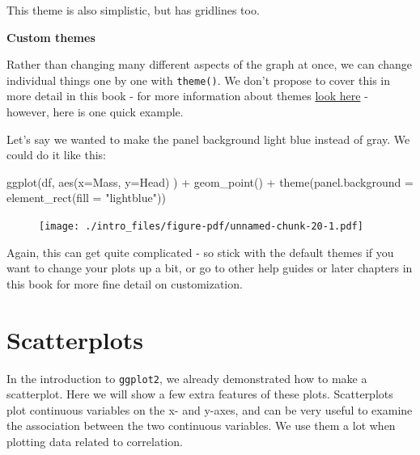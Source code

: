\documentclass[
  letterpaper,
  DIV=11,
  numbers=noendperiod]{scrreprt}
\newenvironment{Shaded}{\begin{snugshade}}{\end{snugshade}}
\newcommand{\AttributeTok}[1]{\textcolor[rgb]{0.40,0.45,0.13}{#1}}
\newcommand{\FunctionTok}[1]{\textcolor[rgb]{0.28,0.35,0.67}{#1}}
\newcommand{\NormalTok}[1]{\textcolor[rgb]{0.00,0.23,0.31}{#1}}
\newcommand{\SpecialCharTok}[1]{\textcolor[rgb]{0.37,0.37,0.37}{#1}}
\newcommand{\StringTok}[1]{\textcolor[rgb]{0.13,0.47,0.30}{#1}}
\begin{document}
This theme is also simplistic, but has gridlines too.

\textbf{Custom themes}

Rather than changing many different aspects of the graph at once, we can
change individual things one by one with \texttt{theme()}. We don't
propose to cover this in more detail in this book - for more information
about themes \href{https://ggplot2-book.org/}{look here} - however, here
is one quick example.

Let's say we wanted to make the panel background light blue instead of
gray. We could do it like this:

\begin{Shaded}
\begin{Highlighting}[]
\FunctionTok{ggplot}\NormalTok{(df, }\FunctionTok{aes}\NormalTok{(}\AttributeTok{x=}\NormalTok{Mass, }\AttributeTok{y=}\NormalTok{Head) ) }\SpecialCharTok{+} 
  \FunctionTok{geom\_point}\NormalTok{() }\SpecialCharTok{+}
  \FunctionTok{theme}\NormalTok{(}\AttributeTok{panel.background =} \FunctionTok{element\_rect}\NormalTok{(}\AttributeTok{fill =} \StringTok{"lightblue"}\NormalTok{))}
\end{Highlighting}
\end{Shaded}

\begin{figure}[H]

{\centering \texttt{[image: ./intro\_files/figure-pdf/unnamed-chunk-20-1.pdf]}

}

\end{figure}

Again, this can get quite complicated - so stick with the default themes
if you want to change your plots up a bit, or go to other help guides or
later chapters in this book for more fine detail on customization.


\hypertarget{scatterplots}{%
\chapter{Scatterplots}\label{scatterplots}}

In the introduction to \texttt{ggplot2}, we already demonstrated how to
make a scatterplot. Here we will show a few extra features of these
plots. Scatterplots plot continuous variables on the x- and y-axes, and
can be very useful to examine the association between the two continuous
variables. We use them a lot when plotting data related to correlation.
\end{document}
